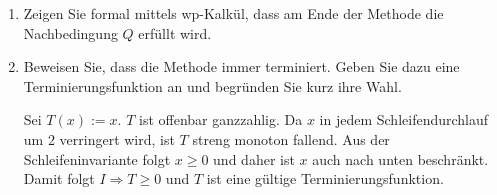 \documentclass{lehramt-informatik-aufgabe}
\begin{document}
\begin{enumerate}

\item Zeigen Sie formal mittels wp-Kalkül, dass am Ende der Methode die
Nachbedingung $Q$ erfüllt wird.


\item Beweisen Sie, dass die Methode immer terminiert. Geben Sie dazu
eine Terminierungsfunktion an und begründen
Sie kurz ihre Wahl.

\begin{antwort}
Sei $T (x) := x$. $T$ ist offenbar ganzzahlig. Da $x$ in jedem
Schleifendurchlauf um $2$ verringert wird, ist $T$ streng monoton
fallend. Aus der Schleifeninvariante folgt $x \geq 0$ und daher ist $x$
auch nach unten beschränkt. Damit folgt $I \Rightarrow T \geq 0$ und $T$
ist eine gültige Terminierungsfunktion.
\end{antwort}

\end{enumerate}
\end{document}
